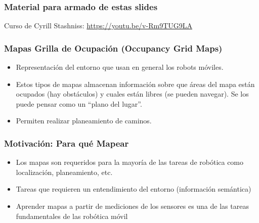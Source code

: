 \begin{frame}
	\frametitle{Material para armado de estas slides}
	Curso de Cyrill Stashniss: \url{https://youtu.be/v-Rm9TUG9LA}

\end{frame}

\begin{frame}
    \frametitle{Mapas Grilla de Ocupación (Occupancy Grid Maps)}
    
    \begin{itemize}
    \item Representación del entorno que usan en general los robots móviles.
    \item Estos tipos de mapas almacenan información sobre que áreas del mapa están ocupados (hay obstáculos) y cuales están libres (se pueden navegar). Se los puede pensar como un ``plano del lugar''.
    \item Permiten realizar planeamiento de caminos.
    \end{itemize}

    
\end{frame}

\begin{frame}
    \frametitle{Motivación: Para qué Mapear}
    
    \begin{itemize}
        \item Los mapas son requeridos para la mayoría de las tareas de robótica como localización, planeamiento, etc.
        \item Tareas que requieren un entendimiento del entorno (información semántica)
        \item Aprender mapas a partir de mediciones de los sensores es una de las tareas fundamentales de las robótica móvil
    \end{itemize}
    
\end{frame}

